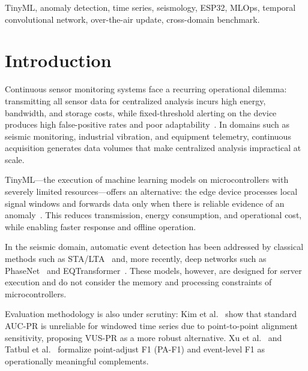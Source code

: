 \documentclass[conference]{IEEEtran}
\begin{document}
\begin{IEEEkeywords}
TinyML, anomaly detection, time series, seismology, ESP32, MLOps,
temporal convolutional network, over-the-air update, cross-domain benchmark.
\end{IEEEkeywords}

\section{Introduction}
\label{sec:intro}

Continuous sensor monitoring systems face a recurring operational dilemma:
transmitting all sensor data for centralized analysis incurs high energy,
bandwidth, and storage costs, while fixed-threshold alerting on the device
produces high false-positive rates and poor adaptability~\cite{sculley2015hidden}.
In domains such as seismic monitoring, industrial vibration, and equipment
telemetry, continuous acquisition generates data volumes that make centralized
analysis impractical at scale.

TinyML---the execution of machine learning models on microcontrollers with
severely limited resources---offers an alternative: the edge device processes
local signal windows and forwards data only when there is reliable evidence
of an anomaly~\cite{warden2019tinyml,banbury2021mlperf}.
This reduces transmission, energy consumption, and operational cost, while
enabling faster response and offline operation.

In the seismic domain, automatic event detection has been addressed by classical
methods such as STA/LTA~\cite{allen1978automatic,withers1998comparison} and,
more recently, deep networks such as PhaseNet~\cite{zhu2019phasenet} and
EQTransformer~\cite{mousavi2020earthquake}.
These models, however, are designed for server execution and do not consider
the memory and processing constraints of microcontrollers.

Evaluation methodology is also under scrutiny:
Kim et al.~\cite{kim2022towards} show that standard AUC-PR is unreliable
for windowed time series due to point-to-point alignment sensitivity,
proposing VUS-PR as a more robust alternative.
Xu et al.~\cite{xu2018donut} and Tatbul et al.~\cite{tatbul2018precision}
formalize point-adjust F1 (PA-F1) and event-level F1 as operationally
meaningful complements.
\end{document}
